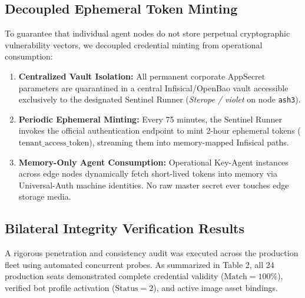 \documentclass[11pt,a4paper]{article}
\begin{document}
\subsection{Decoupled Ephemeral Token Minting}

To guarantee that individual agent nodes do not store perpetual cryptographic vulnerability vectors, we decoupled credential minting from operational consumption:
\begin{enumerate}
    \item \textbf{Centralized Vault Isolation:} All permanent corporate $\text{AppSecret}$ parameters are quarantined in a central Infisical/OpenBao vault accessible exclusively to the designated Sentinel Runner (\textit{Sterope / violet} on node \texttt{ash3}).
    \item \textbf{Periodic Ephemeral Minting:} Every 75 minutes, the Sentinel Runner invokes the official authentication endpoint to mint 2-hour ephemeral tokens ($\text{tenant\_access\_token}$), streaming them into memory-mapped Infisical paths.
    \item \textbf{Memory-Only Agent Consumption:} Operational Key-Agent instances across edge nodes dynamically fetch short-lived tokens into memory via Universal-Auth machine identities. No raw master secret ever touches edge storage media.
\end{enumerate}

\subsection{Bilateral Integrity Verification Results}

A rigorous penetration and consistency audit was executed across the production fleet using automated concurrent probes. As summarized in Table 2, all 24 production seats demonstrated complete credential validity ($\text{Match} = 100\%$), verified bot profile activation ($\text{Status} = 2$), and active image asset bindings.
\end{document}
